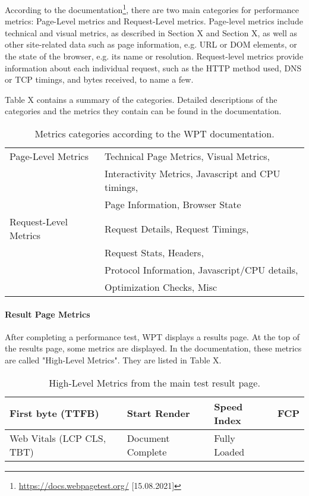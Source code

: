According to the documentation\footnote{\url{https://docs.webpagetest.org/} [15.08.2021]}, there are two main categories for performance metrics: Page-Level metrics and Request-Level metrics.
Page-level metrics include technical and visual metrics, as described in Section X and Section X, as well as other site-related data such as page information, e.g. URL or DOM elements, or the state of the browser, e.g. its name or resolution.
Request-level metrics provide information about each individual request, such as the HTTP method used, DNS or TCP timings, and bytes received, to name a few.

Table X contains a summary of the categories.
Detailed descriptions of the categories and the metrics they contain can be found in the documentation.

\begin{table}[h]
	\small
	\centering
	\begin{tabular}{ | l | l | }
	\hline
	Page-Level Metrics & Technical Page Metrics, Visual Metrics, \\
	& Interactivity Metrics, Javascript and CPU timings, \\
	& Page Information, Browser State \\
	\hline
	Request-Level Metrics & Request Details, Request Timings, \\
	& Request Stats, Headers, \\
	& Protocol Information, Javascript/CPU details, \\
	& Optimization Checks, Misc \\
	\hline
	\end{tabular}
	\medskip
	\caption{Metrics categories according to the WPT documentation.}
	\label{table:wpt_metrics_categories}
\end{table}


\paragraph{Result Page Metrics} %

After completing a performance test, WPT displays a results page.
At the top of the results page, some metrics are displayed.
In the documentation, these metrics are called "High-Level Metrics".
They are listed in Table X.


\begin{table}[h]
	\small
	\centering
	\begin{tabular}{| l | l | l | l |}
	\hline
	First byte (TTFB) & Start Render & Speed Index & FCP \\
	\hline
	Web Vitals (LCP CLS, TBT) & Document Complete & Fully Loaded & \\
	\hline
	\end{tabular}
	\medskip
	\caption{High-Level Metrics from the main test result page.}
	\label{table:wpt_metrics_categories}
\end{table}

